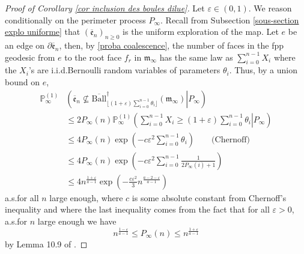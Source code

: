\documentclass[11pt]{article}
\numberwithin{equation}{section}
\def\vp{\varepsilon}
\def\P{\mathbb{P}}
\begin{document}
\begin{proof}[Proof of Corollary \ref{cor inclusion des boules dilue}]
Let $\vp \in (0,1)$. We reason conditionally on the perimeter process $P_\infty$. {Recall from Subsection \ref{sous-section explo uniforme} that $(\overline{\mathfrak{e}}_n)_{n\ge 0}$ is the uniform exploration of the map.} Let $e$ be an edge on $\partial\overline{\mathfrak{e}}_n$, then, by \eqref{proba coalescence}, the number of faces in the fpp geodesic from $e$ to the root face $f_r$ in $\mathfrak{m}_\infty$ has the same law as 
$
\sum_{i=0}^{n-1} X_i
$ 
where the $X_i$'s are i.i.d.\@ Bernoulli random variables of parameters $\theta_i$. Thus, by a union bound on $e$,
\begin{align*}
\P^{(1)}_\infty
&\left(
\left.
\overline{\mathfrak{e}}_n \not\subseteq \overline{\mathrm{Ball}}^\dagger_{\lfloor (1+\vp)
\sum_{i=0}^{n-1} \theta_i	
\rfloor}(\mathfrak{m}_\infty)
\right\vert
P_\infty
\right)
\\
&\le 
2P_\infty(n)
\P^{(1)}_\infty
\left(
\left.
\sum_{i=0}^{n-1} X_i
\ge 
(1+\vp)
\sum_{i=0}^{n-1} \theta_i
\right\vert
P_\infty
\right) \\
&\le 4 P_\infty(n) \exp\left(
-c
\vp^2
\sum_{i=0}^{n-1} \theta_i
\right) \qquad \text{(Chernoff)}
\\
&\le 4P_\infty(n) \exp\left(-c\vp^2 \sum_{i=0}^{n-1} \frac{1}{2P_\infty(i)+1} \right)  \\
&\le
4 n^{\frac{1+\vp}{a-1}}
\exp \left(
-\frac{c \vp^2 }{3}
n^{\frac{a-2-\vp}{a-1}}
\right)
\end{align*}
a.s.\@ for all $n$ large enough, where $c$ is some absolute constant from Chernoff's inequality and where the last inequality comes from the fact that for all $\vp>0$, a.s.\@ for $n$ large enough we have 
\begin{equation}\label{eq encadrement p s perimetre}
	n^{\frac{1-\vp}{a-1}} \le P_\infty(n) \le n^{\frac{1+\vp}{a-1}}
\end{equation} 
by Lemma 10.9 of \cite{StFlour}. 


\end{proof}
\end{document}

